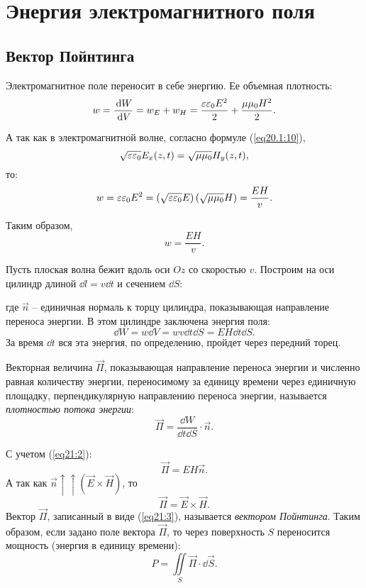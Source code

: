 \chapter{Энергия электромагнитного поля}

\section{Вектор Пойнтинга}

	Электромагнитное поле переносит в себе энергию. Ее объемная плотность:
	\[
        w = \frac{\,\mathrm{d} W}{\,\mathrm{d} V} = w_E + w_H =
        \frac{\varepsilon\varepsilon_0 E^2}{2} + \frac{\mu\mu_0 H^2}{2}.
    \]
	
	А так как в электромагнитной волне, согласно формуле (\ref{eq20.1:10}),
	\[
        \sqrt{\varepsilon\varepsilon_0}E_x(z, t) = \sqrt{\mu\mu_0}H_y(z, t),
    \]
	то:
	\[
        w = \varepsilon\varepsilon_0 E^2 =
        \left(\sqrt{\varepsilon\varepsilon_0}E\right) \left(\sqrt{\mu\mu_0}H\right) =
        \frac{EH}{v}.
    \]

	Таким образом,
	\begin{equation}
		w = \frac{EH}{v}.
        \label{eq21:1}
	\end{equation}
	
	Пусть плоская волна бежит вдоль оси \( Oz \) со скоростью \( v \). Построим
    на оси цилиндр длиной \( \dd l = v\dd t \) и сечением \( \dd S \):
	
	где \( \vec{n} \) -- единичная нормаль к торцу цилиндра, показывающая
    направление переноса энергии. В этом цилиндре заключена энергия поля:
	\begin{equation}
		\dd W = w\dd V = wv\dd t\dd S = EH\dd t\dd S.
        \label{eq21:2}
	\end{equation}
	За время \( \dd t \) вся эта энергия, по определению, пройдет через передний
    торец.
	
	\begin{definition}
        Векторная величина \( \vec{\Pi} \), показывающая направление переноса
        энергии и численно равная количеству энергии, переносимому за единицу 
        времени через единичную площадку, перпендикулярную направлению переноса
        энергии, называется \textit{плотностью потока энергии}:
        \[
            \vec{\Pi} = \frac{\dd W}{\dd t\dd S}\cdot\vec{n}.
        \]
	\end{definition}
	
	С учетом (\ref{eq21:2}):
	\[
        \vec{\Pi} = EH\vec{n}.
    \]
	А так как \( \vec{n} \uparrow\uparrow (\vec{E} \times \vec{H}) \), то
	\begin{equation}
		\vec{\Pi} = \vec{E}\times\vec{H}.
        \label{eq21:3}
	\end{equation}
	Вектор \( \vec{\Pi} \), записанный в виде (\ref{eq21:3}), называется
    \textit{вектором Пойнтинга}. Таким образом, если задано поле вектора
    \( \vec{\Pi} \), то через поверхность \( S \) переносится мощность
    (энергия в единицу времени):
	\[
        P = \iint\limits_S \vec{\Pi}\cdot\dd\vec{S}.
    \]
	
